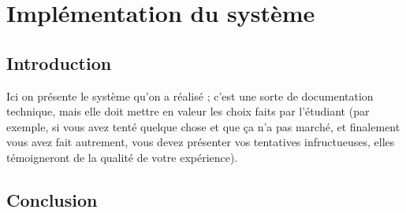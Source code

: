 \chapter{Implémentation du système}
\minitoc
\newpage

\section{Introduction}

Ici on présente le système qu'on a réalisé ; c'est une sorte de documentation technique, mais elle doit mettre en valeur les choix faits par l'étudiant (par exemple, si vous avez tenté quelque chose et que ça n'a pas marché, et finalement vous avez fait autrement, vous devez présenter vos tentatives infructueuses, elles témoigneront de la qualité de votre expérience).

\section{Conclusion}